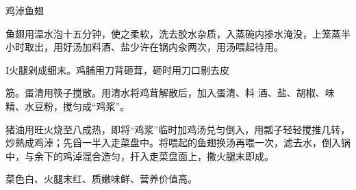 \begin{recipe}{鸡淖鱼翅}

\ingredients


\cooking

\step 鱼翅用温水泡十五分钟，使之柔软，洗去胶水杂质，入蒸碗内掺水淹没，上笼蒸半小时取出，用好汤加料酒、盐少许在锅内汆两次，用汤喂起待用。

I火腿剁成细末。鸡脯用刀背砸茸，砸时用刀口剔去皮

筋。蛋清用筷子搅散。用清水将鸡茸解散后，加入蛋清、料 酒、盐、胡椒、味精、水豆粉，搅匀成“鸡浆”。

\step 猪油用旺火烧至八成热，即将“鸡浆”临时加鸡汤兑匀倒入，用瓢子轻轻搅推几转，炒熟成鸡淖；先舀一半入走菜盘中。将喂起的鱼翅换汤再喂一次，滤去水，倒入锅中，与余下的鸡淖混合造匀，扞入走菜盘面上，撒火腿末即成。

\notes

菜色白、火腿末红、质嫩味鲜、营养价值高。

\end{recipe}

